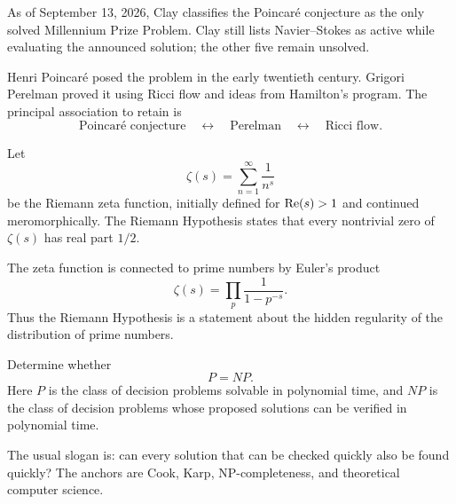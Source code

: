     \begin{fact}
        As of September 13, 2026, Clay classifies the Poincaré conjecture as the
        only solved Millennium Prize Problem. Clay still lists Navier--Stokes as
        active while evaluating the announced solution; the other five remain
        unsolved.
    \end{fact}

    \begin{remark}
        Henri Poincaré posed the problem in the early twentieth century. Grigori
        Perelman proved it using Ricci flow and ideas from Hamilton's program.
        The principal association to retain is
        \[
            \text{Poincaré conjecture}
            \quad\longleftrightarrow\quad
            \text{Perelman}
            \quad\longleftrightarrow\quad
            \text{Ricci flow}.
        \]
    \end{remark}

    \begin{hypothesis}
        Let
        \[
            \zeta(s)=\sum_{n=1}^{\infty}\frac{1}{n^s}
        \]
        be the Riemann zeta function, initially defined for $\operatorname{Re}(s)>1$ and
        continued meromorphically. The Riemann Hypothesis states that every
        nontrivial zero of $\zeta(s)$ has real part $1/2$.
    \end{hypothesis}

    \begin{idea}
        The zeta function is connected to prime numbers by Euler's product
        \[
            \zeta(s)=\prod_{p}\frac{1}{1-p^{-s}}.
        \]
        Thus the Riemann Hypothesis is a statement about the hidden regularity
        of the distribution of prime numbers.
    \end{idea}

    \begin{openproblem}[P versus NP]
        Determine whether
        \[
            P=NP.
        \]
        Here $P$ is the class of decision problems solvable in polynomial time,
        and $NP$ is the class of decision problems whose proposed solutions can
        be verified in polynomial time.
    \end{openproblem}

    \begin{remark}
        The usual slogan is: can every solution that can be checked quickly also
        be found quickly? The anchors are Cook, Karp, NP-completeness, and
        theoretical computer science.
    \end{remark}

